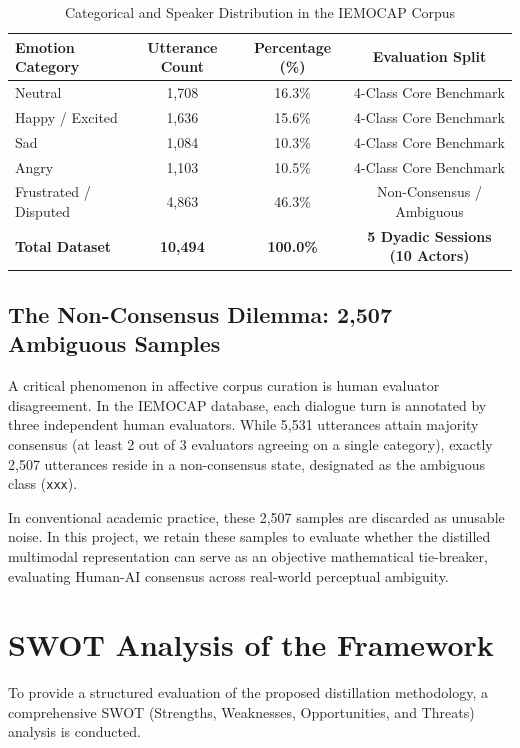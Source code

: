 \begin{table}[htbp]
\centering
\caption{Categorical and Speaker Distribution in the IEMOCAP Corpus}
\label{tab:iemocap_stats}
\begin{tabular}{lccc}
\toprule
\textbf{Emotion Category} & \textbf{Utterance Count} & \textbf{Percentage (\%)} & \textbf{Evaluation Split} \\
\midrule
Neutral & 1,708 & 16.3\% & 4-Class Core Benchmark \\
Happy / Excited & 1,636 & 15.6\% & 4-Class Core Benchmark \\
Sad & 1,084 & 10.3\% & 4-Class Core Benchmark \\
Angry & 1,103 & 10.5\% & 4-Class Core Benchmark \\
Frustrated / Disputed & 4,863 & 46.3\% & Non-Consensus / Ambiguous \\
\midrule
\textbf{Total Dataset} & \textbf{10,494} & \textbf{100.0\%} & \textbf{5 Dyadic Sessions (10 Actors)} \\
\bottomrule
\end{tabular}
\end{table}

\subsection{The Non-Consensus Dilemma: 2,507 Ambiguous Samples}
A critical phenomenon in affective corpus curation is human evaluator disagreement. In the IEMOCAP database, each dialogue turn is annotated by three independent human evaluators. While 5,531 utterances attain majority consensus (at least 2 out of 3 evaluators agreeing on a single category), exactly 2,507 utterances reside in a non-consensus state, designated as the ambiguous class (\texttt{xxx}). 

In conventional academic practice, these 2,507 samples are discarded as unusable noise. In this project, we retain these samples to evaluate whether the distilled multimodal representation can serve as an objective mathematical tie-breaker, evaluating Human-AI consensus across real-world perceptual ambiguity.

\section{SWOT Analysis of the Framework}
To provide a structured evaluation of the proposed distillation methodology, a comprehensive SWOT (Strengths, Weaknesses, Opportunities, and Threats) analysis is conducted.

